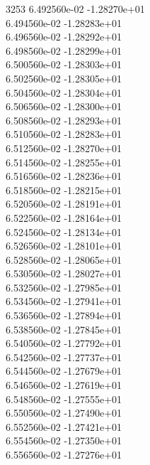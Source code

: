 3253	6.492560e-02	-1.28270e+01	\\ 	6.494560e-02	-1.28283e+01	\\ 	6.496560e-02	-1.28292e+01	\\ 	6.498560e-02	-1.28299e+01	\\ 	6.500560e-02	-1.28303e+01	\\ 	6.502560e-02	-1.28305e+01	\\ 	6.504560e-02	-1.28304e+01	\\ 	6.506560e-02	-1.28300e+01	\\ 	6.508560e-02	-1.28293e+01	\\ 	6.510560e-02	-1.28283e+01	\\ 	6.512560e-02	-1.28270e+01	\\ 	6.514560e-02	-1.28255e+01	\\ 	6.516560e-02	-1.28236e+01	\\ 	6.518560e-02	-1.28215e+01	\\ 	6.520560e-02	-1.28191e+01	\\ 	6.522560e-02	-1.28164e+01	\\ 	6.524560e-02	-1.28134e+01	\\ 	6.526560e-02	-1.28101e+01	\\ 	6.528560e-02	-1.28065e+01	\\ 	6.530560e-02	-1.28027e+01	\\ 	6.532560e-02	-1.27985e+01	\\ 	6.534560e-02	-1.27941e+01	\\ 	6.536560e-02	-1.27894e+01	\\ 	6.538560e-02	-1.27845e+01	\\ 	6.540560e-02	-1.27792e+01	\\ 	6.542560e-02	-1.27737e+01	\\ 	6.544560e-02	-1.27679e+01	\\ 	6.546560e-02	-1.27619e+01	\\ 	6.548560e-02	-1.27555e+01	\\ 	6.550560e-02	-1.27490e+01	\\ 	6.552560e-02	-1.27421e+01	\\ 	6.554560e-02	-1.27350e+01	\\ 	6.556560e-02	-1.27276e+01	\\ \hline
